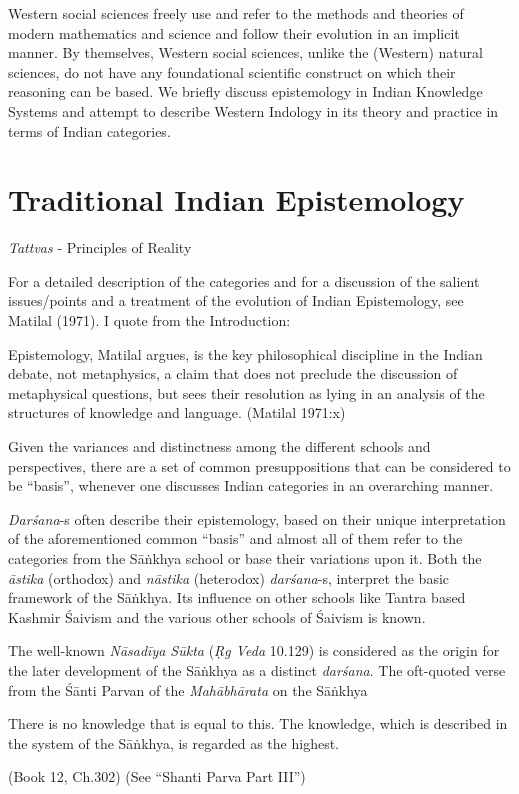 Western social sciences freely use and refer to the methods and theories of modern mathematics and science and follow their evolution in an implicit manner.  By themselves, Western social sciences, unlike the (Western) natural sciences, do not have any foundational scientific construct on which their reasoning can be based. We briefly discuss epistemology in Indian Knowledge Systems and attempt to describe Western Indology in its theory and practice in terms of Indian categories.

\section*{Traditional Indian Epistemology}

{\sl Tattvas} - Principles of Reality

For a detailed description of the categories and for a discussion of the salient issues/points and a treatment of the evolution of Indian Epistemology, see Matilal (1971). I quote from the Introduction:
\begin{myquote}
Epistemology, Matilal argues, is the key philosophical discipline in the Indian debate, not metaphysics, a claim that does not preclude the discussion of metaphysical questions, but sees their resolution as lying in an analysis of the structures of knowledge and language. (Matilal 1971:x)
\end{myquote}

Given the variances and distinctness among the different schools and perspectives, there are a set of common presuppositions that can be considered to be ``basis'', whenever one discusses Indian categories in an overarching manner.

{\sl Darśana}-s often describe their epistemology, based on their unique interpretation of the aforementioned common ``basis'' and almost all of them refer to the categories from the Sāṅkhya school or base their variations upon it. Both the {\sl āstika} (orthodox) and {\sl nāstika} (heterodox) {\sl darśana}-s, interpret the basic framework of the Sāṅkhya. Its influence on other schools like Tantra based Kashmir Śaivism and the various other schools of Śaivism is known.

The well-known {\sl Nāsadīya Sūkta} ({\sl Ṛg Veda} 10.129) is considered as the origin for the later development of the Sāṅkhya as a distinct {\sl darśana}. The oft-quoted verse from the Śānti Parvan of the {\sl Mahābhārata} on the Sāṅkhya
\begin{myquote}
There is no knowledge that is equal to this. The knowledge, which is described in the system of the Sāṅkhya, is regarded as the highest.

\hfill (Book 12, Ch.302) (See ``Shanti Parva Part III'')
\end{myquote}

